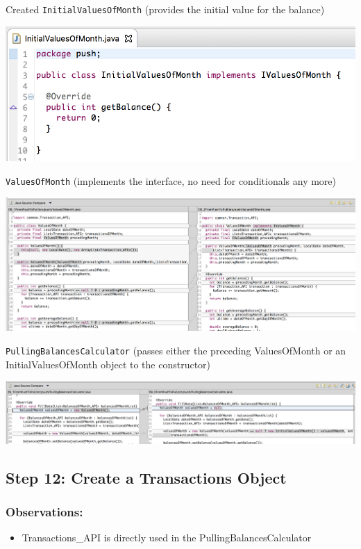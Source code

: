 \documentclass[a4paper,fleqn,titlepage,11pt]{article}
\begin{document}
Created \texttt{InitialValuesOfMonth} (provides the initial value for the balance)

\includegraphics[width=1\textwidth]{CompareViews/11-4.png}

\texttt{ValuesOfMonth} (implements the interface, no need for conditionals any more)

\includegraphics[width=1\textwidth]{CompareViews/10-11-1.png}

\texttt{PullingBalancesCalculator} (passes either the preceding ValuesOfMonth or an InitialValuesOfMonth object to the constructor)

\includegraphics[width=1\textwidth]{CompareViews/10-11-2.png}


\subsection*{Step 12: Create a Transactions Object}

\subsubsection*{Observations:}
\begin{itemize}
\item Transactions\_API is directly used in the PullingBalancesCalculator
\end{itemize}
\end{document}
